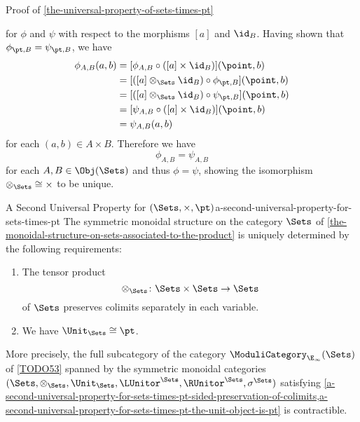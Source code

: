 \begin{Proof}{Proof of \cref{the-universal-property-of-sets-times-pt}}
\begin{webcompile}
    \end{webcompile}
    for $\phi$ and $\psi$ with respect to the morphisms $[a]$ and $\id_{B}$. Having shown that $\phi_{\pt,B}=\psi_{\pt,B}$, we have
    \begin{align*}
        \phi_{A,B}(a,b) &= [\phi_{A,B}\circ([a]\times\id_{B})](\point,b)\\
                        &= [([a]\otimes_{\Sets}\id_{B})\circ\phi_{\pt,B}](\point,b)\\
                        &= [([a]\otimes_{\Sets}\id_{B})\circ\psi_{\pt,B}](\point,b)\\
                        &= [\psi_{A,B}\circ([a]\times\id_{B})](\point,b)\\%
                        &= \psi_{A,B}(a,b)
    \end{align*}
    for each $(a,b)\in A\times B$. Therefore we have
    \[
        \phi_{A,B}%
        =%
        \psi_{A,B}%
    \]%
    for each $A,B\in\Obj(\Sets)$ and thus $\phi=\psi$, showing the isomorphism $\mathord{\otimes_{\Sets}}\cong\mathord{\times}$ to be unique.
\end{Proof}
\begin{corollary}{A Second Universal Property for $(\Sets,\times,\pt)$}{a-second-universal-property-for-sets-times-pt}%
    The symmetric monoidal structure on the category $\Sets$ of \cref{the-monoidal-structure-on-sets-associated-to-the-product} is uniquely determined by the following requirements:
    \begin{enumerate}
        \item\label{a-second-universal-property-for-sets-times-pt-sided-preservation-of-colimits}The tensor product
            \[
                \otimes_{\Sets}%
                \colon
                \Sets\times\Sets
                \to
                \Sets
            \]%
            of $\Sets$ preserves colimits separately in each variable.
        \item\label{a-second-universal-property-for-sets-times-pt-the-unit-object-is-pt}We have $\Unit_{\Sets}\cong\pt$.
    \end{enumerate}
    More precisely, the full subcategory of the category $\ModuliCategory_{\E_{\infty}}(\Sets)$ of \cref{TODO53} spanned by the symmetric monoidal categories $(\Sets,\otimes_{\Sets},\Unit_{\Sets},\LUnitor^{\Sets},\RUnitor^{\Sets},\sigma^{\Sets})$ satisfying \cref{a-second-universal-property-for-sets-times-pt-sided-preservation-of-colimits,a-second-universal-property-for-sets-times-pt-the-unit-object-is-pt} is contractible.
\end{corollary}

